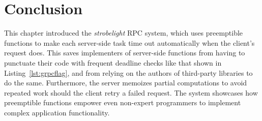 \section{Conclusion}

This chapter introduced the \textit{strobelight} RPC system, which uses preemptible
functions to make each server-side task time out automatically when the client's
request does.  This saves implementers of server-side functions from having to
punctuate their code with frequent deadline checks like that shown in
Listing~\ref{lst:grpcflag}, and from relying on the authors of third-party libraries
to do the same.  Furthermore, the server memoizes partial computations to avoid
repeated work should the client retry a failed request.  The system showcases how
preemptible functions empower even non-expert programmers to implement complex
application functionality.
